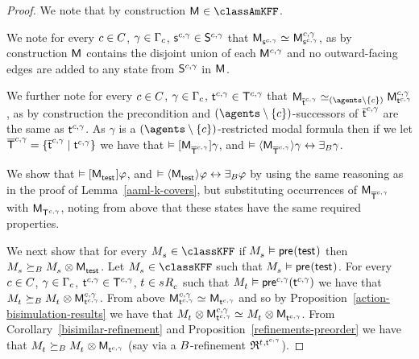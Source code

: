 \begin{proof}
We note that by construction $\aModel \in \classAmKFF$.


We note for every $\agentC \in \agentsC$, $\gamma \in \Gamma_\agentC$, $\aStateS[\agentC, \gamma] \in \aStates[\agentC, \gamma]$ that $\aPModel{\aStateS[\agentC, \gamma]} \bisimilar \aPModel[\agentC, \gamma]{\aStateS[\agentC, \gamma]}$, as by construction $\aModel$ contains the disjoint union of each $\aModel[\agentC, \gamma]$ and no outward-facing edges are added to any state from $\aStates[\agentC, \gamma]$ in $\aModel$.

We further note for every $\agentC \in \agentsC$, $\gamma \in \Gamma_\agentC$, $\aStateT[\agentC, \gamma] \in \aStatesT[\agentC, \gamma]$ that $\aPModel{\aPStateT[\agentC, \gamma]} \bisimilar[(\agents \setminus \{\agentC\})] \aPModel[\agentC, \gamma]{\aStateT[\agentC, \gamma]}$, as by construction the precondition and $(\agents \setminus \{\agentC\})$-successors of $\aPStateT[\agentC, \gamma]$ are the same as $\aStateT[\agentC, \gamma]$.
As $\gamma$ is a $(\agents \setminus \{\agentC\})$-restricted modal formula then if we let $\aPStatesT[\agentC, \gamma] = \{\aPStateT[\agentC, \gamma] \mid \aStateT[\agentC, \gamma]\}$ we have that
$\entails \actionA{\aPModel{\aPStatesT[\agentC, \gamma]}} \gamma$, and
$\entails \actionE{\aPModel{\aPStatesT[\agentC, \gamma]}} \gamma \iff \someactsBs \gamma$.

We show that
$\entails \actionA{\aPModel{\aStateTest}} \phi$, and 
$\entails \actionE{\aPModel{\aStateTest}} \phi \iff \someactsBs \phi$
by using the same reasoning as in the proof of Lemma~\ref{aaml-k-covers},
but substituting occurrences of $\aPModel{\aPStatesT[\agentC, \gamma]}$ with $\aPModel{\aStatesT[\agentC, \gamma]}$, noting from above that these states have the same required properties.

We next show that for every $\kPModel{\kStateS} \in \classKFF$ if $\kPModel{\kStateS} \entails \aPrecondition(\aStateTest)$ then $\kPModel{\kStateS} \simulatesBs \kPModel{\kStateS} \exec \aPModel{\aStateTest}$.
Let $\kPModel{\kStateS} \in \classKFF$ such that $\kPModel{\kStateS} \entails \aPrecondition(\aStateTest)$.
For every $\agentC \in \agentsC$, $\gamma \in \Gamma_\agentC$, $\aStateT[\agentC, \gamma] \in \aStatesT[\agentC, \gamma]$, $\kStateT \in \kSuccessorsC{\kStateS}$ such that $\kPModel{\kStateT} \entails \aPrecondition[\agentC,\gamma](\aStateT[\agentC,\gamma])$ we have that $\kPModel{\kStateT} \simulatesBs \kPModel{\kStateT} \exec \aPModel[\agentC, \gamma]{\aStateT[\agentC, \gamma]}$.
From above $\aPModel[\agentC, \gamma]{\aStateT[\agentC, \gamma]} \bisimilar \aPModel{\aStateT[\agentC, \gamma]}$ and so by 
Proposition~\ref{action-bisimulation-results} we have that $\kPModel{\kStateT} \exec \aPModel[\agentC, \gamma]{\aStateT[\agentC, \gamma]} \bisimilar \kPModel{\kStateT} \exec \aPModel{\aStateT[\agentC, \gamma]}$.
From Corollary~\ref{bisimilar-refinement} and Proposition~\ref{refinements-preorder} we have that $\kPModel{\kStateT} \simulatesBs \kPModel{\kStateT} \exec \aPModel{\aStateT[\agentC, \gamma]}$ (say via a $\agentsB$-refinement $\refinement^{\kStateT, \aStateT[\agentC, \gamma]}$).


\end{proof}
